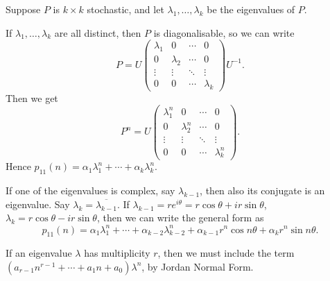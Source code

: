 \documentclass[12pt]{article}
\theoremstyle{definition}
\theoremstyle{remark}
\begin{document}
Suppose $P$ is $k \times k$ stochastic, and let $\lambda_1, \ldots, \lambda_k$ be the eigenvalues of $P$.

If $\lambda_1, \ldots, \lambda_k$ are all distinct, then $P$ is diagonalisable, so we can write
\[
P = U
\begin{pmatrix}
	\lambda_1 & 0 & \cdots & 0 \\
	0 & \lambda_2 & \cdots & 0 \\
	\vdots & \vdots & \ddots & \vdots \\
	0 & 0 & \cdots & \lambda_k
\end{pmatrix}
U^{-1}
.\]
Then we get
\[
P^{n} = U
\begin{pmatrix}
	\lambda_1^{n} & 0 & \cdots & 0 \\
	0 & \lambda_2^{n} & \cdots & 0 \\
	\vdots & \vdots & \ddots & \vdots \\
	0 & 0 & \cdots & \lambda_k^{n}
\end{pmatrix}
.\]
Hence $p_{11}(n) = \alpha_1 \lambda_1^{n} + \cdots + \alpha_k \lambda_k^{n}$.

If one of the eigenvalues is complex, say $\lambda_{k-1}$, then also its conjugate is an eigenvalue. Say $\lambda_{k} = \overline{\lambda_{k-1}}$. If $\lambda_{k-1} = r e^{i \theta} = r \cos \theta + i r \sin \theta$, $\lambda_k = r \cos \theta - i r \sin \theta$, then we can write the general form as
\[
	p_{11}(n) = \alpha_1 \lambda_1^{n} + \cdots + \alpha_{k-2} \lambda_{k-2}^{n} + \alpha_{k-1} r^{n} \cos n \theta + \alpha_{k} r^{n} \sin n \theta
.\]

If an eigenvalue $\lambda$ has multiplicity $r$, then we must include the term $(a_{r-1}n^{r-1} + \cdots + a_1 n + a_0) \lambda^{n}$, by Jordan Normal Form.

\newpage

\printindex
\end{document}
